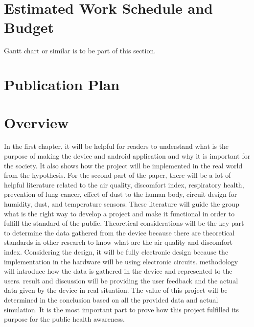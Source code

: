 \ifFinished
\else

\section{Estimated Work Schedule and Budget}

Gantt chart or similar is to be part of this section.

\blindtext

\section{Publication Plan}
\blindtext

\fi


\section{Overview}

In the first chapter, it will be helpful for readers to understand what is the purpose of making the device and android application and why it is important for the society. It also shows how the project will be implemented in the real world from the hypothesis. For the second part of the paper, there will be a lot of helpful literature related to the air quality, discomfort index, respiratory health, prevention of lung cancer, effect of dust to the human body, circuit design for humidity, dust, and temperature sensors. These literature will guide the group what is the right way to develop a project and make it functional in order to fulfill the standard of the public. Theoretical considerations will be the key part to determine the data gathered from the device because there are theoretical standards in other research to know what are the air quality and discomfort index. Considering the design, it will be fully electronic design because the implementation in the hardware will be using electronic circuits. methodology will introduce how the data is gathered in the device and represented to the users. result and discussion will be providing the user feedback and the actual data given by the device in real situation. The value of this project will be determined in the conclusion based on all the provided data and actual simulation. It is the most important part to prove how this project fulfilled its purpose for the public health awareness.

